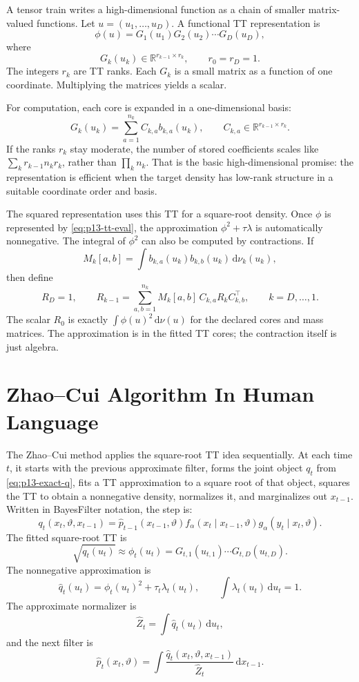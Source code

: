 \documentclass[11pt]{article}
\newcommand{\dd}{\mathrm{d}}
\newcommand{\R}{\mathbb{R}}
\theoremstyle{definition}
\theoremstyle{remark}
\begin{document}
A tensor train writes a high-dimensional function as a chain of smaller
matrix-valued functions.  Let \(u=(u_1,\ldots,u_D)\).  A functional TT
representation is
\[
  \phi(u)
  =
  G_1(u_1)G_2(u_2)\cdots G_D(u_D),
  \label{eq:p13-tt-eval}
\]
where
\[
  G_k(u_k)\in\R^{r_{k-1}\times r_k},
  \qquad r_0=r_D=1.
\]
The integers \(r_k\) are TT ranks.  Each \(G_k\) is a small matrix as a
function of one coordinate.  Multiplying the matrices yields a scalar.

For computation, each core is expanded in a one-dimensional basis:
\[
  G_k(u_k)
  =
  \sum_{a=1}^{n_k} C_{k,a} b_{k,a}(u_k),
  \qquad
  C_{k,a}\in\R^{r_{k-1}\times r_k}.
  \label{eq:p13-core-expansion}
\]
If the ranks \(r_k\) stay moderate, the number of stored coefficients scales
like \(\sum_k r_{k-1}n_k r_k\), rather than \(\prod_k n_k\).  That is the
basic high-dimensional promise: the representation is efficient when the
target density has low-rank structure in a suitable coordinate order and basis.

The squared representation uses this TT for a square-root density.  Once
\(\phi\) is represented by \eqref{eq:p13-tt-eval}, the approximation
\(\phi^2+\tau\lambda\) is automatically nonnegative.  The integral of
\(\phi^2\) can also be computed by contractions.  If
\[
  M_k[a,b]=\int b_{k,a}(u_k)b_{k,b}(u_k)\,\dd\nu_k(u_k),
\]
then define
\[
  R_D=1,\qquad
  R_{k-1}
  =
  \sum_{a,b=1}^{n_k}
  M_k[a,b]\,C_{k,a}R_kC_{k,b}^{\top},
  \qquad k=D,\ldots,1.
  \label{eq:p13-mass-contraction}
\]
The scalar \(R_0\) is exactly \(\int\phi(u)^2\,\dd\nu(u)\) for the declared
cores and mass matrices.  The approximation is in the fitted TT cores; the
contraction itself is just algebra.

\section{Zhao--Cui Algorithm In Human Language}

The Zhao--Cui method applies the square-root TT idea sequentially.  At each
time \(t\), it starts with the previous approximate filter, forms the joint
object \(q_t\) from \eqref{eq:p13-exact-q}, fits a TT approximation to a
square root of that object, squares the TT to obtain a nonnegative density,
normalizes it, and marginalizes out \(x_{t-1}\).  Written in BayesFilter
notation, the step is:
\[
  q_t(x_t,\vartheta,x_{t-1})
  =
  \widehat p_{t-1}(x_{t-1},\vartheta)
  f_\alpha(x_t\mid x_{t-1},\vartheta)
  g_\alpha(y_t\mid x_t,\vartheta).
\]
The fitted square-root TT is
\[
  \sqrt{q_t(u_t)}\approx
  \phi_t(u_t)
  =
  G_{t,1}(u_{t,1})\cdots G_{t,D}(u_{t,D}).
\]
The nonnegative approximation is
\[
  \widehat q_t(u_t)
  =
  \phi_t(u_t)^2+\tau_t\lambda_t(u_t),
  \qquad
  \int\lambda_t(u_t)\,\dd u_t=1.
\]
The approximate normalizer is
\[
  \widehat Z_t=\int\widehat q_t(u_t)\,\dd u_t,
\]
and the next filter is
\[
  \widehat p_t(x_t,\vartheta)
  =
  \int
  \frac{\widehat q_t(x_t,\vartheta,x_{t-1})}{\widehat Z_t}
  \,\dd x_{t-1}.
\]
\end{document}
